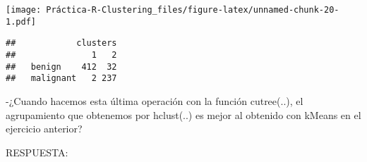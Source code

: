 \documentclass[
]{article}
\newenvironment{Shaded}{\begin{snugshade}}{\end{snugshade}}
\newcommand{\KeywordTok}[1]{\textcolor[rgb]{0.13,0.29,0.53}{\textbf{#1}}}
\newcommand{\NormalTok}[1]{#1}
\newcommand{\OperatorTok}[1]{\textcolor[rgb]{0.81,0.36,0.00}{\textbf{#1}}}
\begin{document}
\texttt{[image: Práctica-R-Clustering\_files/figure-latex/unnamed-chunk-20-1.pdf]}

\begin{Shaded}
\end{Shaded}

\begin{verbatim}
##            clusters
##               1   2
##   benign    412  32
##   malignant   2 237
\end{verbatim}

-¿Cuando hacemos esta última operación con la función cutree(..), el
agrupamiento que obtenemos por hclust(..) es mejor al obtenido con
kMeans en el ejercicio anterior?

RESPUESTA:
\end{document}

